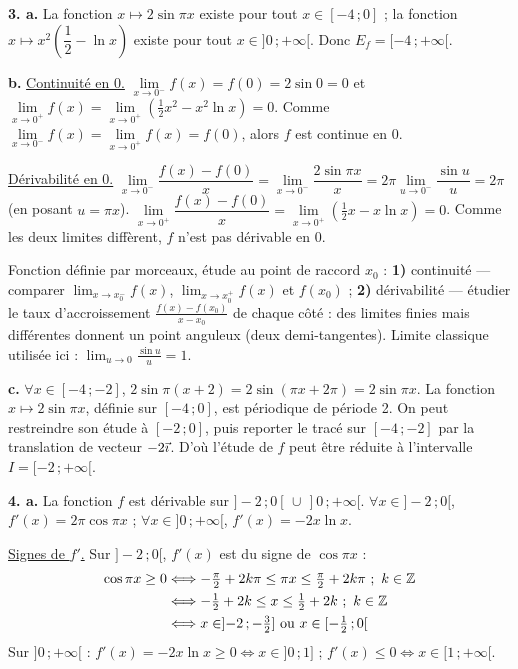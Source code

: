 \documentclass[11pt]{article}
\begin{document}
\textbf{3. a.} La fonction $x \mapsto 2\sin\pi x$ existe pour tout $x \in [-4\,;0]$ ; la fonction $x \mapsto x^2\left(\dfrac{1}{2} - \ln x\right)$ existe pour tout $x \in ]0\,;+\infty[$. Donc $E_f = [-4\,;+\infty[$.

\textbf{b.} \underline{Continuité en 0.} $\lim\limits_{x\to 0^-} f(x) = f(0) = 2\sin 0 = 0$ et $\lim\limits_{x\to 0^+} f(x) = \lim\limits_{x\to 0^+}\left(\tfrac{1}{2}x^2 - x^2\ln x\right) = 0$. Comme $\lim\limits_{x\to 0^-} f(x) = \lim\limits_{x\to 0^+} f(x) = f(0)$, alors $f$ est continue en 0.

\underline{Dérivabilité en 0.} $\lim\limits_{x\to 0^-}\dfrac{f(x) - f(0)}{x} = \lim\limits_{x\to 0^-}\dfrac{2\sin\pi x}{x} = 2\pi\lim\limits_{u\to 0^-}\dfrac{\sin u}{u} = 2\pi$ (en posant $u = \pi x$). $\lim\limits_{x\to 0^+}\dfrac{f(x) - f(0)}{x} = \lim\limits_{x\to 0^+}\left(\tfrac{1}{2}x - x\ln x\right) = 0$. Comme les deux limites diffèrent, $f$ n'est pas dérivable en 0.

\begin{methode}
Fonction définie par morceaux, étude au point de raccord $x_0$ :
\textbf{1)} continuité — comparer $\lim_{x\to x_0^-} f(x)$,
$\lim_{x\to x_0^+} f(x)$ et $f(x_0)$ ; \textbf{2)} dérivabilité —
étudier le taux d'accroissement $\frac{f(x)-f(x_0)}{x-x_0}$ de chaque
côté : des limites finies mais différentes donnent un point anguleux
(deux demi-tangentes). Limite classique utilisée ici :
$\lim_{u\to 0}\frac{\sin u}{u} = 1$.
\end{methode}

\textbf{c.} $\forall x \in [-4\,;-2]$, $2\sin\pi(x+2) = 2\sin(\pi x + 2\pi) = 2\sin\pi x$. La fonction $x \mapsto 2\sin\pi x$, définie sur $[-4\,;0]$, est périodique de période 2. On peut restreindre son étude à $[-2\,;0]$, puis reporter le tracé sur $[-4\,;-2]$ par la translation de vecteur $-2\vec{\imath}$. D'où l'étude de $f$ peut être réduite à l'intervalle $I = [-2\,;+\infty[$.

\textbf{4. a.} La fonction $f$ est dérivable sur $]-2\,;0[\,\cup\,]0\,;+\infty[$. $\forall x \in ]-2\,;0[$, $f'(x) = 2\pi\cos\pi x$ ; $\forall x \in ]0\,;+\infty[$, $f'(x) = -2x\ln x$.

\underline{Signes de $f'$.} Sur $]-2\,;0[$, $f'(x)$ est du signe de $\cos\pi x$ :
\begin{align*}
\cos\pi x \ge 0 &\Longleftrightarrow -\tfrac{\pi}{2} + 2k\pi \le \pi x \le \tfrac{\pi}{2} + 2k\pi\ ;\ k \in \Z \\
&\Longleftrightarrow -\tfrac{1}{2} + 2k \le x \le \tfrac{1}{2} + 2k\ ;\ k \in \Z \\
&\Longleftrightarrow x \in ]{-2}\,;-\tfrac{3}{2}] \text{ ou } x \in [-\tfrac{1}{2}\,;0[
\end{align*}
Sur $]0\,;+\infty[$ : $f'(x) = -2x\ln x \ge 0 \Leftrightarrow x \in ]0\,;1]$ ; $f'(x) \le 0 \Leftrightarrow x \in [1\,;+\infty[$.
\end{document}

